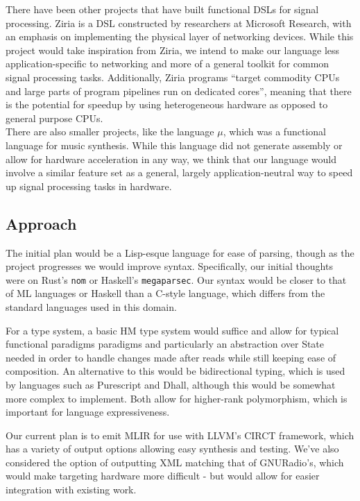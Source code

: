 \documentclass{article}
\begin{document}
There have been other projects that have built functional DSLs for signal processing. Ziria is a DSL constructed by researchers at Microsoft Research, with an emphasis on implementing the physical layer of networking devices. While this project would take inspiration from Ziria, we intend to make our language less application-specific to networking and more of a general toolkit for common signal processing tasks. Additionally, Ziria programs ``target commodity CPUs and large parts of program pipelines run on dedicated cores'', meaning that there is the potential for speedup by using heterogeneous hardware as opposed to general purpose CPUs. \\

There are also smaller projects, like the language $\mu$, which was a functional language for music synthesis. While this language did not generate assembly or allow for hardware acceleration in any way, we think that our language would involve a similar feature set as a general, largely application-neutral way to speed up signal processing tasks in hardware. 

\subsection{Approach}
The initial plan would be a Lisp-esque language for ease of parsing, though as the project progresses we would improve syntax. Specifically, our initial thoughts were on Rust's \texttt{nom} or Haskell's \texttt{megaparsec}. Our syntax would be closer to that of ML languages or Haskell than a C-style language, which differs from the standard languages used in this domain.

For a type system, a basic HM type system would suffice and allow for typical functional paradigms paradigms and particularly an abstraction over State needed in order to handle changes made after reads while still keeping ease of composition. An alternative to this would be bidirectional typing, which is used by languages such as Purescript and Dhall, although this would be somewhat more complex to implement. Both allow for higher-rank polymorphism, which is important for language expressiveness. 

Our current plan is to emit MLIR for use with LLVM's CIRCT framework, which has a variety of output options allowing easy synthesis and testing. We've also considered the option of outputting XML matching that of GNURadio's, which would make targeting hardware more difficult - but would allow for easier integration with existing work.
\end{document}
